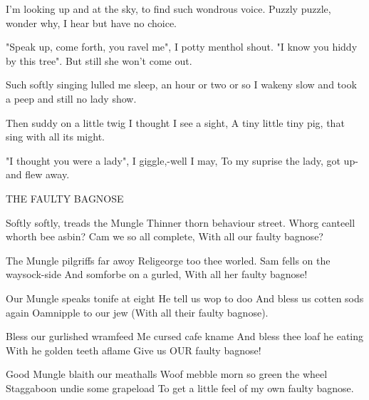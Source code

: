                               I'm looking up and at the sky,
                                to find such wondrous voice.
                              Puzzly puzzle, wonder why,
                                I hear but have no choice.

                              "Speak up, come forth, you ravel me",
                                I potty menthol shout.
                              "I know you hiddy by this tree".
                                But still she won't come out.

                              Such softly singing lulled me sleep,
                                an hour or two or so
                              I wakeny slow and took a peep
                                and still no lady show.

                              Then suddy on a little twig
                               I thought I see a sight,
                              A tiny little tiny pig,
                               that sing with all its might.

                              "I thought you were a lady",
                                I giggle,-well I may,
                              To my suprise the lady,
                                got up-and flew away.





             THE FAULTY BAGNOSE

             Softly softly, treads the Mungle
             Thinner thorn behaviour street.
             Whorg canteell whorth bee asbin?
             Cam we so all complete,
             With all our faulty bagnose?

             The Mungle pilgriffs far awoy
             Religeorge too thee worled.
             Sam fells on the waysock-side
             And somforbe on a gurled,
             With all her faulty bagnose!

             Our Mungle speaks tonife at eight
             He tell us wop to doo
             And bless us cotten sods again
             Oamnipple to our jew
             (With all their faulty bagnose).

             Bless our gurlished wramfeed
             Me cursed cafe kname
             And bless thee loaf he eating
             With he golden teeth aflame
             Give us OUR faulty bagnose!

             Good Mungle blaith our meathalls
             Woof mebble morn so green the wheel
             Staggaboon undie some grapeload
             To get a little feel
             of my own faulty bagnose.

